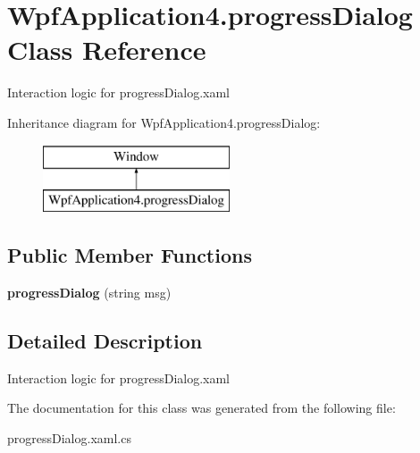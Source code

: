 \hypertarget{class_wpf_application4_1_1progress_dialog}{\section{Wpf\-Application4.\-progress\-Dialog Class Reference}
\label{class_wpf_application4_1_1progress_dialog}
}


Interaction logic for progress\-Dialog.\-xaml  


Inheritance diagram for Wpf\-Application4.\-progress\-Dialog\-:\begin{figure}[H]
\begin{center}
\leavevmode
\includegraphics[height=2.000000cm]{class_wpf_application4_1_1progress_dialog}
\end{center}
\end{figure}
\subsection*{Public Member Functions}
\begin{DoxyCompactItemize}
\item 
\hypertarget{class_wpf_application4_1_1progress_dialog_ae837370e9074b63f6c9338ec8f2f1efd}{{\bfseries progress\-Dialog} (string msg)}\label{class_wpf_application4_1_1progress_dialog_ae837370e9074b63f6c9338ec8f2f1efd}

\end{DoxyCompactItemize}


\subsection{Detailed Description}
Interaction logic for progress\-Dialog.\-xaml 



The documentation for this class was generated from the following file\-:\begin{DoxyCompactItemize}
\item 
progress\-Dialog.\-xaml.\-cs\end{DoxyCompactItemize}
